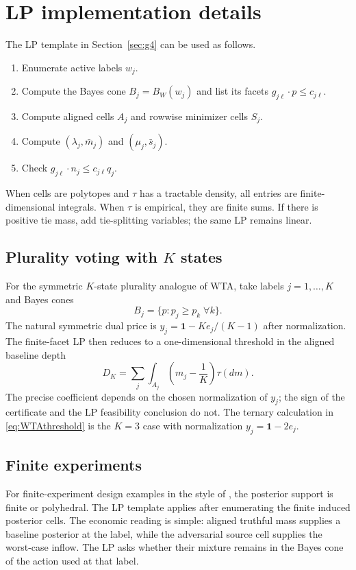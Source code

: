 \documentclass[11pt]{article}
\theoremstyle{definition}
\theoremstyle{remark}
\begin{document}
\section{LP implementation details}\label{app:lp}

The LP template in Section~\ref{sec:g4} can be used as follows.
\begin{enumerate}[leftmargin=*]
  \item Enumerate active labels $w_j$.
  \item Compute the Bayes cone $B_j=B_W(w_j)$ and list its facets $g_{j\ell}\cdot p\le c_{j\ell}$.
  \item Compute aligned cells $A_j$ and rowwise minimizer cells $S_j$.
  \item Compute $(\lambda_j,\bar m_j)$ and $(\mu_j,\bar s_j)$.
  \item Check $g_{j\ell}\cdot n_j\le c_{j\ell}q_j$.
\end{enumerate}
When cells are polytopes and $\tau$ has a tractable density, all entries are finite-dimensional integrals. When $\tau$ is empirical, they are finite sums. If there is positive tie mass, add tie-splitting variables; the same LP remains linear.

\subsection{Plurality voting with $K$ states}

For the symmetric $K$-state plurality analogue of WTA, take labels $j=1,\ldots,K$ and Bayes cones
\[
  B_j=\{p:p_j\ge p_k\;\forall k\}.
\]
The natural symmetric dual price is $y_j=\mathbf{1}-K e_j/(K-1)$ after normalization. The finite-facet LP then reduces to a one-dimensional threshold in the aligned baseline depth
\[
  D_K=\sum_j\int_{A_j}\left(m_j-\frac1K\right)\tau(dm).
\]
The precise coefficient depends on the chosen normalization of $y_j$; the sign of the certificate and the LP feasibility conclusion do not. The ternary calculation in \eqref{eq:WTAthreshold} is the $K=3$ case with normalization $y_j=\mathbf{1}-2e_j$.

\subsection{Finite experiments}

For finite-experiment design examples in the style of \cite{DovalSmolin2024}, the posterior support is finite or polyhedral. The LP template applies after enumerating the finite induced posterior cells. The economic reading is simple: aligned truthful mass supplies a baseline posterior at the label, while the adversarial source cell supplies the worst-case inflow. The LP asks whether their mixture remains in the Bayes cone of the action used at that label.
\end{document}
